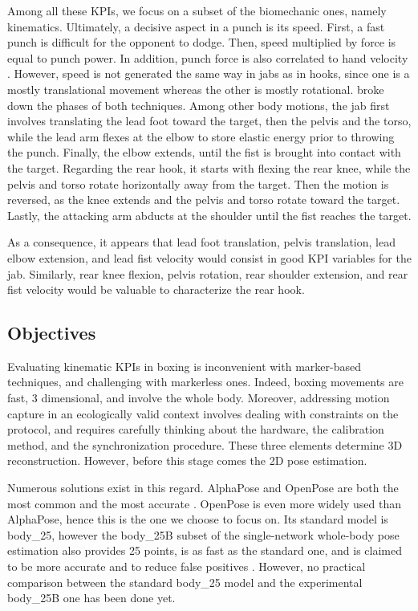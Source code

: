 Among all these KPIs, we focus on a subset of the biomechanic ones, namely kinematics. Ultimately, a decisive aspect in a punch is its speed. First, a fast punch is difficult for the opponent to dodge. Then, speed multiplied by force is equal to punch power. In addition, punch force is also correlated to hand velocity \cite{Mack2010}. However, speed is not generated the same way in jabs as in hooks, since one is a mostly translational movement whereas the other is mostly rotational. \cite{Lenetsky2020} broke down the phases of both techniques. Among other body motions, the jab first involves translating the lead foot toward the target, then the pelvis and the torso, while the lead arm flexes at the elbow to store elastic energy prior to throwing the punch. Finally, the elbow extends, until the fist is brought into contact with the target. Regarding the rear hook, it starts with flexing the rear knee, while the pelvis and torso rotate horizontally away from the target. Then the motion is reversed, as the knee extends and the pelvis and torso rotate toward the target. Lastly, the attacking arm abducts at the shoulder until the fist reaches the target. 

As a consequence, it appears that lead foot translation, pelvis translation, lead elbow extension, and lead fist velocity would consist in good KPI variables for the jab. Similarly, rear knee flexion, pelvis rotation, rear shoulder extension, and rear fist velocity would be valuable to characterize the rear hook. 


\subsection{Objectives}

Evaluating kinematic KPIs in boxing is inconvenient with marker-based techniques, and challenging with markerless ones. Indeed, boxing movements are fast, 3 dimensional, and involve the whole body. Moreover, addressing motion capture in an ecologically valid context involves dealing with constraints on the protocol, and requires carefully thinking about the hardware, the calibration method, and the synchronization procedure. These three elements determine 3D reconstruction. However, before this stage comes the 2D pose estimation. 

Numerous solutions exist in this regard. AlphaPose \cite{Fang2017} and OpenPose \cite{Cao2019} are both the most common and the most accurate \cite{Needham2021b,Mroz2021}. OpenPose is even more widely used than AlphaPose, hence this is the one we choose to focus on. Its standard model is body\_25, however the body\_25B subset of the single-network whole-body pose estimation \cite{Hidalgo2019} also provides 25 points, is as fast as the standard one, and is claimed to be more accurate and to reduce false positives \cite{Hidalgo2019,Pagnon2021}. However, no practical comparison between the standard body\_25 model and the experimental body\_25B one has been done yet.

